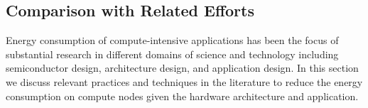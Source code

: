 

\subsection{Comparison with Related Efforts}\label{sec:relwork}

Energy consumption of compute-intensive applications has been the focus of substantial research in different domains of science and technology including semiconductor design, architecture design, and application design. In this section we discuss relevant practices and techniques in the literature to reduce the energy consumption on compute nodes given the hardware architecture and application. 


